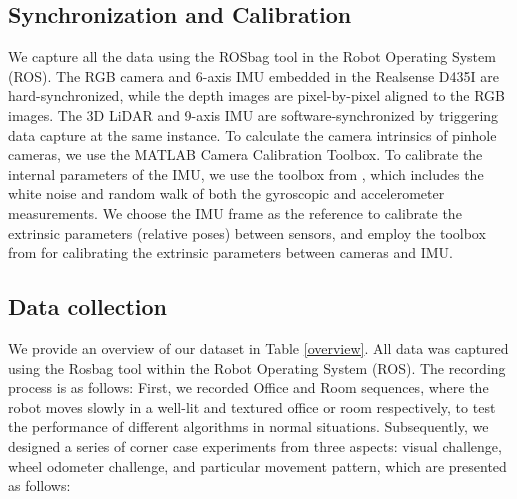 \documentclass[conference]{IEEEtran}
\begin{document}
			
			
			

			
	
	
	\subsection{Synchronization and Calibration}
We capture all the data using the ROSbag tool in the Robot Operating System (ROS). The RGB camera and 6-axis IMU embedded in the Realsense D435I are hard-synchronized, while the depth images are pixel-by-pixel aligned to the RGB images. The 3D LiDAR and 9-axis IMU are software-synchronized by triggering data capture at the same instance. To calculate the camera intrinsics of pinhole cameras, we use the MATLAB Camera Calibration Toolbox. To calibrate the internal parameters of the IMU, we use the toolbox from \cite{UCAM-CL-TR-696}, which includes the white noise and random walk of both the gyroscopic and accelerometer measurements. We choose the IMU frame as the reference to calibrate the extrinsic parameters (relative poses) between sensors, and employ the toolbox from \cite{furgale2013unified} for calibrating the extrinsic parameters between cameras and IMU.
	

	
	\subsection{Data collection}

	
We provide an overview of our dataset in Table \ref{overview}. All data was captured using the Rosbag tool within the Robot Operating System (ROS). The recording process is as follows: First, we recorded Office and Room sequences, where the robot moves slowly in a well-lit and textured office or room respectively, to test the performance of different algorithms in normal situations. Subsequently, we designed a series of corner case experiments from three aspects: visual challenge, wheel odometer challenge, and particular movement pattern, which are presented as follows:
	
\end{document}

